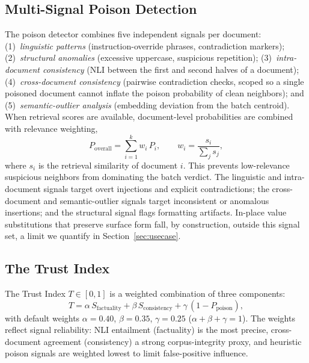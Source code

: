 \subsection{Multi-Signal Poison Detection}
The poison detector combines five independent signals per document: (1)~\emph{linguistic patterns} (instruction-override phrases, contradiction markers); (2)~\emph{structural anomalies} (excessive uppercase, suspicious repetition); (3)~\emph{intra-document consistency} (NLI between the first and second halves of a document); (4)~\emph{cross-document consistency} (pairwise contradiction checks, scoped so a single poisoned document cannot inflate the poison probability of clean neighbors); and (5)~\emph{semantic-outlier analysis} (embedding deviation from the batch centroid). When retrieval scores are available, document-level probabilities are combined with relevance weighting,
\begin{equation}
P_{\text{overall}} = \sum_{i=1}^{k} w_i\,P_i, \qquad w_i = \frac{s_i}{\sum_j s_j},
\end{equation}
where $s_i$ is the retrieval similarity of document $i$. This prevents low-relevance suspicious neighbors from dominating the batch verdict. The linguistic and intra-document signals target overt injections and explicit contradictions; the cross-document and semantic-outlier signals target inconsistent or anomalous insertions; and the structural signal flags formatting artifacts. In-place value substitutions that preserve surface form fall, by construction, outside this signal set, a limit we quantify in Section~\ref{sec:usecase}.

\subsection{The Trust Index}
The Trust Index $T\in[0,1]$ is a weighted combination of three components:
\begin{equation}
\label{eq:trust}
T = \alpha\,S_{\text{factuality}} + \beta\,S_{\text{consistency}} + \gamma\,(1 - P_{\text{poison}}),
\end{equation}
with default weights $\alpha{=}0.40$, $\beta{=}0.35$, $\gamma{=}0.25$ ($\alpha{+}\beta{+}\gamma{=}1$). The weights reflect signal reliability: NLI entailment (factuality) is the most precise, cross-document agreement (consistency) a strong corpus-integrity proxy, and heuristic poison signals are weighted lowest to limit false-positive influence.

